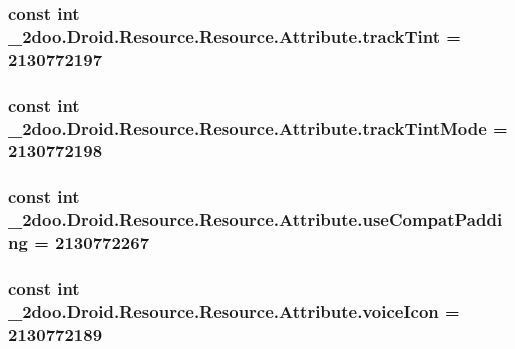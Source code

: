 \hypertarget{class__2doo_1_1_droid_1_1_resource_1_1_attribute_5af75c0b1bfc3dddb71667523b97baab}{
\subsubsection[{trackTint}]{\setlength{\rightskip}{0pt plus 5cm}const int \_\-2doo.Droid.Resource.Resource.Attribute.trackTint = 2130772197}}
\label{class__2doo_1_1_droid_1_1_resource_1_1_attribute_5af75c0b1bfc3dddb71667523b97baab}


\hypertarget{class__2doo_1_1_droid_1_1_resource_1_1_attribute_715dcb935f5123a786e4c18451df2292}{
\subsubsection[{trackTintMode}]{\setlength{\rightskip}{0pt plus 5cm}const int \_\-2doo.Droid.Resource.Resource.Attribute.trackTintMode = 2130772198}}
\label{class__2doo_1_1_droid_1_1_resource_1_1_attribute_715dcb935f5123a786e4c18451df2292}


\hypertarget{class__2doo_1_1_droid_1_1_resource_1_1_attribute_4f9c8913cc01c247ae712dbafe83299f}{
\subsubsection[{useCompatPadding}]{\setlength{\rightskip}{0pt plus 5cm}const int \_\-2doo.Droid.Resource.Resource.Attribute.useCompatPadding = 2130772267}}
\label{class__2doo_1_1_droid_1_1_resource_1_1_attribute_4f9c8913cc01c247ae712dbafe83299f}


\hypertarget{class__2doo_1_1_droid_1_1_resource_1_1_attribute_9cbeef149e7d4cbf9d40e837a790c522}{
\subsubsection[{voiceIcon}]{\setlength{\rightskip}{0pt plus 5cm}const int \_\-2doo.Droid.Resource.Resource.Attribute.voiceIcon = 2130772189}}
\label{class__2doo_1_1_droid_1_1_resource_1_1_attribute_9cbeef149e7d4cbf9d40e837a790c522}


